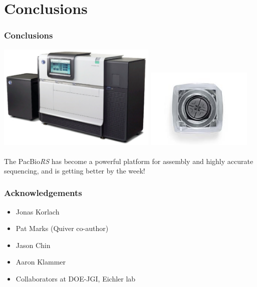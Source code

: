 \documentclass[serif,11pt]{beamer}
\newcommand{\R}{\textsuperscript{\textregistered}}
\begin{document}
\section{Conclusions}
\label{sec-7}
\begin{frame}

   \sectionpage
\end{frame}
\begin{frame}
\frametitle{Conclusions}
\label{sec-7-1}

   \includegraphics[width=3in]{img/RS.pdf}
   \includegraphics[width=2in]{img/smrtcell.jpeg}

   The PacBio\R \emph{RS} has become a powerful platform for assembly and
   highly accurate sequencing, and is getting better by the week!
\end{frame}
\begin{frame}
\frametitle{Acknowledgements}
\label{sec-7-2}

\begin{itemize}
\item Jonas Korlach
\item Pat Marks (Quiver co-author)
\item Jason Chin
\item Aaron Klammer
\item Collaborators at DOE-JGI, Eichler lab
\end{itemize}
\end{frame}
\end{document}
